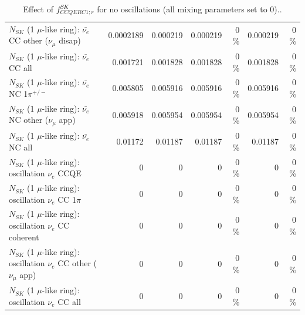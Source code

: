 \begin{table}
\begin{tabular}{| l | r | r | r  r | r  r |}
          $N_{SK}$ (1 $\mu$-like ring): $\bar{\nu_e}$ CC other ($\nu_\mu$ disap) &       0.0002189 &        0.000219 &        0.000219 &        0 \%  &        0.000219 &        0 \%  \\ 
                            $N_{SK}$ (1 $\mu$-like ring): $\bar{\nu_{e}}$ CC all &        0.001721 &        0.001828 &        0.001828 &        0 \%  &        0.001828 &        0 \%  \\ 
\hline
                     $N_{SK}$ (1 $\mu$-like ring): $\bar{\nu_e}$ NC 1$\pi^{+/-}$ &        0.005805 &        0.005916 &        0.005916 &        0 \%  &        0.005916 &        0 \%  \\ 
            $N_{SK}$ (1 $\mu$-like ring): $\bar{\nu_e}$ NC other ($\nu_\mu$ app) &        0.005918 &        0.005954 &        0.005954 &        0 \%  &        0.005954 &        0 \%  \\ 
                            $N_{SK}$ (1 $\mu$-like ring): $\bar{\nu_{e}}$ NC all &         0.01172 &         0.01187 &         0.01187 &        0 \%  &         0.01187 &        0 \%  \\ 
\hline
\hline
\hline
                          $N_{SK}$ (1 $\mu$-like ring): oscillation $\nu_e$ CCQE &               0 &               0 &               0 &        0 \%  &               0 &        0 \%  \\ 
                     $N_{SK}$ (1 $\mu$-like ring): oscillation $\nu_e$ CC 1$\pi$ &               0 &               0 &               0 &        0 \%  &               0 &        0 \%  \\ 
                   $N_{SK}$ (1 $\mu$-like ring): oscillation $\nu_e$ CC coherent &               0 &               0 &               0 &        0 \%  &               0 &        0 \%  \\ 
      $N_{SK}$ (1 $\mu$-like ring): oscillation $\nu_e$ CC other ($\nu_\mu$ app) &               0 &               0 &               0 &        0 \%  &               0 &        0 \%  \\ 
                       $N_{SK}$ (1 $\mu$-like ring): oscillation $\nu_e$  CC all &               0 &               0 &               0 &        0 \%  &               0 &        0 \%  \\ 
\hline
\hline
\end{tabular}
\caption{ Effect of $f_{CCQERC1; r}^{SK}$ for no oscillations (all mixing parameters set to 0).. }
\label{tab:num_sk_1Rmu_ccqe_ring_counting_eff_1_1RmuT_3f_osc_t13:0_spectralreco_spectraltrue}
\end{table}
